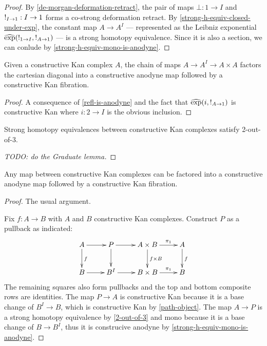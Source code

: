 \documentclass[reqno,10pt,a4paper,oneside]{amsart}
\begin{document}
\begin{proof}
By \cref{de-morgan-deformation-retract}, the pair of maps $\bot : 1 \to I$ and $\mathord{!}_{I \to 1} : I \to 1$ forms a co-strong deformation retract.
By \cref{strong-h-equiv-closed-under-exp}, the constant map $A \to A^I$ --- represented as the Leibniz exponential $\operatorname{\widehat{exp}}(\mathord{!}_{1 \to I}, \mathord{!}_{A \to 1})$ --- is a strong homotopy equivalence.
Since it is also a section, we can conlude by \cref{strong-h-equiv-mono-is-anodyne}.
\end{proof}

\begin{corollary}
\label{path-object}
Given a constructive Kan complex $A$, the chain of maps $A \to A^I \to A \times A$ factors the cartesian diagonal into a constructive anodyne map followed by a constructive Kan fibration.
\end{corollary}

\begin{proof}
A consequence of \cref{refl-is-anodyne} and the fact that $\operatorname{\widehat{exp}}(i, \mathord{!}_{A \to 1})$ is constructive Kan where $i : 2 \to I$ is the obvious inclusion.
\end{proof}

\begin{lemma}
\label{2-out-of-3}
Strong homotopy equivalences between constructive Kan complexes satisfy 2-out-of-3. 
\end{lemma}

\begin{proof}
[TODO: do the Graduate lemma] 
\end{proof}

\begin{proposition}
\label{fibrant-cod-factorization}
Any map between constructive Kan complexes can be factored into a constructive anodyne map followed by a constructive Kan fibration.
\end{proposition}

\begin{proof}
The usual argument.

Fix $f : A \to B$ with $A$ and $B$ constructive Kan complexes.
Construct $P$ as a pullback as indicated:
\[
\xymatrix{
  A
  \ar[r]
  \ar[d]^{f}
&
  P
  \ar[r]
  \ar[d]
&
  A \times B
  \ar[r]^-{\pi_1}
  \ar[d]^{f \times B}
&
  A
  \ar[d]^{f}
\\
  B
  \ar[r]
&
  B^I
  \ar[r]
&
  B \times B
  \ar[r]^-{\pi_1}
&
  B
}
\]
The remaining squares also form pullbacks and the top and bottom composite rows are identities.
The map $P \to A$ is constructive Kan because it is a base change of $B^I \to B$, which is constructive Kan by \cref{path-object}.
The map $A \to P$ is a strong homotopy equivalence by \cref{2-out-of-3} and mono because it is a base change of $B \to B^I$, thus it is construcive anodyne by \cref{strong-h-equiv-mono-is-anodyne}.
\end{proof}
\end{document}
